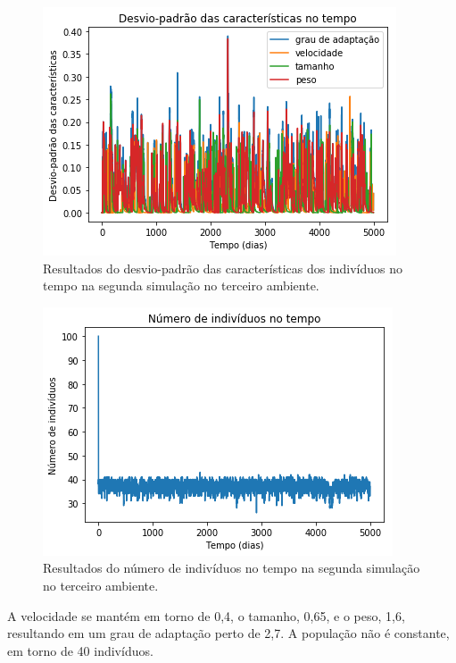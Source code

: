 \documentclass[10pt,brazil,english]{article}
\begin{document}
        \begin{figure}[!hbtp]
            \begin{center}
                \includegraphics[scale=0.5]{Images/3-5.png}
            \end{center}
            \caption{Resultados do desvio-padrão das características dos indivíduos no tempo na segunda simulação no terceiro ambiente.}
            \label{Fig17}
        \end{figure} 
        
        \begin{figure}[!hbtp]
            \begin{center}
                \includegraphics[scale=0.5]{Images/3-6.png}
            \end{center}
            \caption{Resultados do número de indivíduos no tempo na segunda simulação no terceiro ambiente.}
            \label{Fig18}
        \end{figure}
        
        A velocidade se mantém em torno de 0,4, o tamanho, 0,65, e o peso, 1,6, resultando em um grau de adaptação perto de 2,7. A população não é constante, em torno de 40 indivíduos.
        
\end{document}
